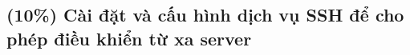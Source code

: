 \subsection{(10\%) Cài đặt và cấu hình dịch vụ SSH để cho phép điều khiển từ xa server}
\setcounter{figure}{0}
